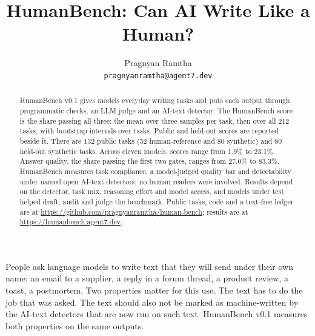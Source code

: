\documentclass[10pt,twocolumn]{article}
\title{\LARGE\textbf{HumanBench: Can AI Write Like a Human?}}
\author{Pragnyan Ramtha\\ \texttt{pragnyanramtha@agent7.dev}}
\date{}
\makeatletter
\renewcommand\section{\@startsection{section}{1}{\z@}{-2.6ex \@plus -1ex \@minus -.2ex}{1.5ex \@plus .2ex}{\normalfont\Large\bfseries\raggedright}}
\newcommand{\hbrepo}{https://github.com/pragnyanramtha/human-bench}
\newcommand{\hbsite}{https://humanbench.agent7.dev}
\edef\hb@repo{\hbrepo}\edef\hb@site{\hbsite}
\newcommand{\hbrepourl}{\expandafter\url\expandafter{\hb@repo}}
\newcommand{\hbsiteurl}{\expandafter\url\expandafter{\hb@site}}
\newcommand{\hb}{HumanBench}
\makeatother
\begin{document}
\maketitle

\begin{abstract}
\hb{} v0.1 gives models everyday writing tasks and puts each output through programmatic checks, an LLM judge and an AI-text detector. The HumanBench score is the share passing all three: the mean over three samples per task, then over all 212 tasks, with bootstrap intervals over tasks. Public and held-out scores are reported beside it. There are 132 public tasks (52 human-reference and 80 synthetic) and 80 held-out synthetic tasks. Across eleven models, scores range from 1.9\% to 23.1\%. Answer quality, the share passing the first two gates, ranges from 27.0\% to 83.3\%. HumanBench measures task compliance, a model-judged quality bar and detectability under named open AI-text detectors; no human readers were involved. Results depend on the detector, task mix, reasoning effort and model access, and models under test helped draft, audit and judge the benchmark. Public tasks, code and a text-free ledger are at \hbrepourl; results are at \hbsiteurl.
\end{abstract}

\section{Introduction}

People ask language models to write text that they will send under their own name: an email to a supplier, a reply in a forum thread, a product review, a toast, a postmortem. Two properties matter for this use. The text has to do the job that was asked. The text should also not be marked as machine-written by the AI-text detectors that are now run on such text. \hb{} v0.1 measures both properties on the same outputs.
\end{document}
